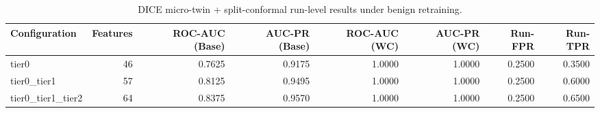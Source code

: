 \begin{table}[t]
\centering
\caption{DICE micro-twin + split-conformal run-level results under benign retraining.}
\label{tab:dice_full_overall}
\footnotesize
\begin{tabular}{lrrrrrrr}
\toprule
Configuration & Features & ROC-AUC (Base) & AUC-PR (Base) & ROC-AUC (WC) & AUC-PR (WC) & Run-FPR & Run-TPR \\
\midrule
tier0 & 46 & 0.7625 & 0.9175 & 1.0000 & 1.0000 & 0.2500 & 0.3500 \\
tier0_tier1 & 57 & 0.8125 & 0.9495 & 1.0000 & 1.0000 & 0.2500 & 0.6000 \\
tier0_tier1_tier2 & 64 & 0.8375 & 0.9570 & 1.0000 & 1.0000 & 0.2500 & 0.6500 \\
\bottomrule
\end{tabular}

\end{table}
